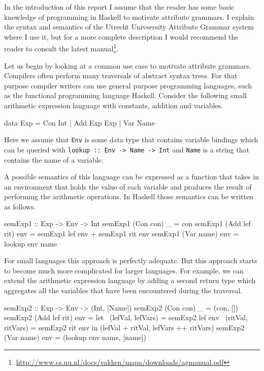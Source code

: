 \documentclass[11pt]{article}
\begin{document}
In the introduction of this report I assume that the reader has some basic knowledge of programming in Haskell to motivate attribute grammars. I explain the syntax and semantics of the Utrecht Univsersity Attribute Grammar system where I use it, but for a more complete description I would recommend the reader to consult the latest manual\footnote{\url{http://www.cs.uu.nl/docs/vakken/mapa/downloads/agmanual.pdf}}.

Let us begin by looking at a common use case to motivate attribute grammars.
Compilers often perform many traversals of abstract syntax trees.
For that purpose compiler writers can use general purpose programming languages, such as the functional programming language Haskell.
Consider the following small arithmetic expression language with constants, addition and variables.

\begin{code}
data Exp = Con Int | Add Exp Exp | Var Name
\end{code}

Here we assume that \texttt{Env} is some data type that contains variable bindings which can be queried with \texttt{lookup :: Env -> Name -> Int} and \texttt{Name} is a string that contains the name of a variable.

A possible semantics of this language can be expressed as a function that takes in an environment that holds the value of each variable and produces the result of performing the arithmetic operations. In Haskell those semantics can be written as follows.

\begin{code}
semExp1 :: Exp -> Env -> Int
semExp1 (Con con)     _   = con
semExp1 (Add lef rit) env = semExp1 lef env + semExp1 rit env
semExp1 (Var name)    env = lookup env name
\end{code}

For small languages this approach is perfectly adequate. But this approach starts to become much more complicated for larger languages. For example, we can extend the arithmetic expression language by adding a second return type which aggregates all the variables that have been encountered during the traversal.

\begin{code}
semExp2 :: Exp -> Env -> (Int, [Name])
semExp2 (Con con)     _   = (con, [])
semExp2 (Add lef rit) env = let ~(lefVal, lefVars) = semExp2 lef env
                                ~(ritVal, ritVars) = semExp2 rit env
                            in (lefVal + ritVal, lefVars ++ ritVars)
semExp2 (Var name)    env = (lookup env name, [name])
\end{code}
\end{document}
